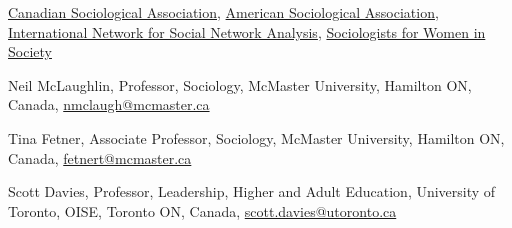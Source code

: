 \documentclass[9pt,usenames,dvipsnames]{article}
\begin{document}




\noindent \href{http://www.csa-scs.ca}{Canadian Sociological Association}, \href{http://www.asanet.org}{American Sociological Association}, \href{http://www.insna.org}{International Network for Social Network Analysis}, \href{http://www.socwomen.org}{Sociologists for Women in Society} \\


\ind Neil McLaughlin, Professor, Sociology, McMaster University, Hamilton ON, Canada, \href{mailto:nmclaugh@mcmaster.ca}{nmclaugh@mcmaster.ca}

\ind Tina Fetner, Associate Professor, Sociology, McMaster University, Hamilton ON, Canada, \href{mailto:fetnert@mcmaster.ca}{fetnert@mcmaster.ca}

\ind Scott Davies, Professor, Leadership, Higher and Adult Education, University of Toronto, OISE, Toronto ON, Canada, \href{mailto:scott.davies@utoronto.ca}{scott.davies@utoronto.ca}
\end{document}
